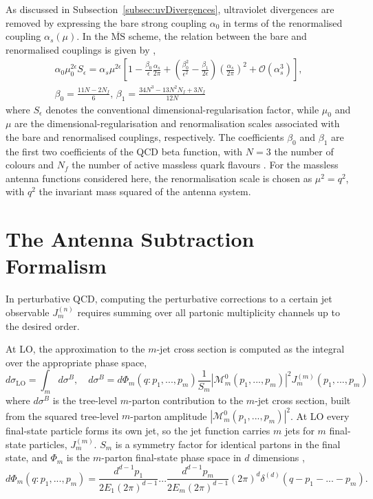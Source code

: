 As discussed in Subsection~\ref{subsec:uvDivergences}, ultraviolet divergences are
removed by expressing the bare strong coupling $\alpha_0$ in terms of the
renormalised coupling $\alpha_s(\mu)$. In the $\overline{\text{MS}}$ scheme, the
relation between the bare and renormalised couplings is given by
\cite{Gehrmann-DeRidder:2005btv},
\begin{equation}\label{eq:alphaRescaling}
    \begin{gathered}
        \alpha_0\mu_0^{2\epsilon}S_\epsilon = \alpha_s\mu^{2\epsilon}\left[1-\frac{\beta_0}{\epsilon}\frac{\alpha_s}{2\pi}+\left(\frac{\beta_0^2}{\epsilon^2}-\frac{\beta_1}{2\epsilon}\right)\left(\frac{\alpha_s}{2\pi}\right)^2+\mathcal O(\alpha_s^3)\right],\\
        \beta_0=\frac{11N-2N_f}{6},\,\beta_1=\frac{34N^3-13N^2N_f+3N_f}{12N}
    \end{gathered}
\end{equation}
where $S_\epsilon$ denotes the conventional dimensional-regularisation factor,
while $\mu_0$ and $\mu$ are the dimensional-regularisation and renormalisation
scales associated with the bare and renormalised couplings, respectively. The
coefficients $\beta_0$ and $\beta_1$ are the first two coefficients of the QCD
beta function, with $N=3$ the number of colours and $N_f$ the number of active
massless quark flavours \cite{Ellis:1996mzs,Gehrmann-DeRidder:2005btv}. For the
massless antenna functions considered here, the renormalisation scale is chosen
as $\mu^2=q^2$, with $q^2$ the invariant mass squared of the antenna system.

\section{The Antenna Subtraction Formalism}\label{sec:antSubForm}

In perturbative QCD, computing the perturbative corrections to a certain jet
observable $J_m^{(n)}$ requires summing over all partonic multiplicity channels
up to the desired order.

At LO, the approximation to the $m$-jet cross section is computed as the integral
over the appropriate phase space,
\begin{equation}\label{eq:bornLevel}
    d\sigma_\text{LO} = \int_m d\sigma^B,\quad d\sigma^B=d\Phi_m(q:p_1,...,p_m)\frac1{S_m}|\mathcal M_m^0(p_1,...,p_m)|^2J_m^{(m)}(p_1,...,p_m)
\end{equation}
where $d\sigma^B$ is the tree-level $m$-parton contribution to the $m$-jet cross
section, built from the squared tree-level $m$-parton amplitude $|\mathcal M_m^0(p_1,...,p_m)|^2$.
At LO every final-state particle forms its own jet, so the jet function carries
$m$ jets for $m$ final-state particles, $J_m^{(m)}$. $S_m$ is a symmetry factor for
identical partons in the final state, and
$\Phi_m$ is the $m$-parton final-state phase space in $d$ dimensions \cite{Gehrmann-DeRidder:2005btv},
\begin{equation}
    d\Phi_m(q:p_1,...,p_m)=\frac{d^{d-1}p_1}{2E_1(2\pi)^{d-1}}...\frac{d^{d-1}p_m}{2E_m(2\pi)^{d-1}}(2\pi)^d\delta^{(d)}(q-p_1-...-p_m).
\end{equation}

